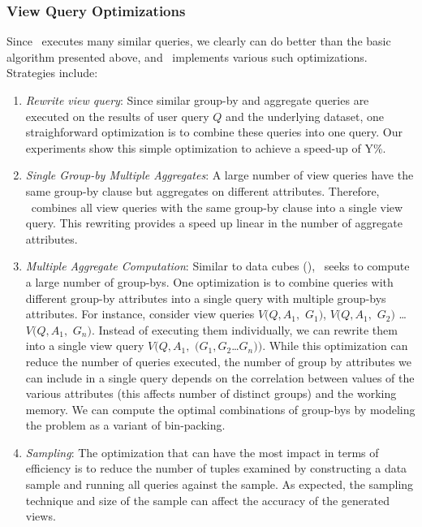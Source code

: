\subsubsection{View Query Optimizations}
\label{subsubsec:optimizations}

Since \SeeDB\ executes many similar queries, we clearly can do better than
the basic algorithm presented above, and \SeeDB\ implements various such
optimizations. Strategies include:

\begin{enumerate}
  \item {\it Rewrite view query}: Since similar group-by and aggregate queries
  are executed on the results of user query $Q$ and the underlying dataset,
  one straighforward optimization is to combine these queries into one
  query. Our experiments show this simple optimization to achieve a
  speed-up of Y\%.
  \item {\it Single Group-by Multiple Aggregates}: A large number of view
  queries have the same group-by clause but aggregates on different attributes.
  Therefore, \SeeDB\ combines all view queries with the same group-by clause
  into a single view query. This rewriting provides a speed up linear in the
  number of aggregate attributes.
  \item {\it Multiple Aggregate Computation}: Similar to data cubes (\cite{}),
  \SeeDB\ seeks to compute a large number of group-bys. One optimization is to
  combine queries with different group-by attributes into a single query with
  multiple group-bys attributes. For instance, consider view queries $V(Q,
  A_1,$ $G_1)$, $V(Q, A_1,$ $G_2)$ \ldots $V(Q, A_1,$ $G_n)$. Instead of
  executing them individually, we can rewrite them into a single view query
  $V(Q, A_1,$ $(G_1, G_2$\ldots $G_n))$. While this optimization can reduce the
  number of queries executed, the number of group by attributes we can include in a single query
  depends on the correlation between values of the various attributes (this
  affects number of distinct groups) and the working memory. We can compute the
  optimal combinations of group-bys by modeling the problem as a variant of
  bin-packing. 
  \item {\it Sampling}: The optimization that can have the most impact in
  terms of efficiency is to reduce the number of tuples examined by
  constructing a data sample and running all queries against the sample. As
  expected, the sampling technique and size of the sample can affect the
  accuracy of the generated views. 
\end{enumerate}



